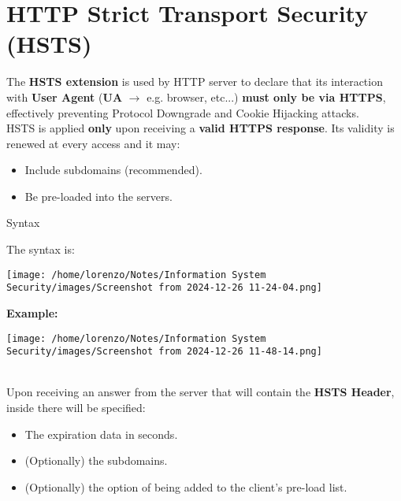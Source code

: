 \section{HTTP Strict Transport Security (HSTS)}
The \textbf{HSTS extension} is used by HTTP server to declare that its interaction with \textbf{User Agent} (\textbf{UA} \(\rightarrow\) e.g. browser, etc...) \textbf{must only be via HTTPS}, effectively preventing Protocol Downgrade and Cookie Hijacking attacks.\\ HSTS is applied \textbf{only} upon receiving a \textbf{valid HTTPS response}. Its validity is renewed at every access and it may:
\begin{itemize}
    \item Include subdomains (recommended).
    \item Be pre-loaded into the servers.
\end{itemize}
\begin{quotebox-grey}{Syntax}   
\begin{minipage}{0.4\textwidth}
    The syntax is:
    \begin{center}
        \texttt{[image: /home/lorenzo/Notes/Information System Security/images/Screenshot from 2024-12-26 11-24-04.png]}  
    \end{center}
\end{minipage} 
\hspace{1cm}
\begin{minipage}{0.4\textwidth}
    \textbf{Example:}
    \begin{center}
        \texttt{[image: /home/lorenzo/Notes/Information System Security/images/Screenshot from 2024-12-26 11-48-14.png]} 
    \end{center} 
\end{minipage}
\newline
\\
Upon receiving an answer from the server that will contain the \textbf{HSTS Header}, inside there will be specified:
\begin{itemize}
    \item The expiration data in seconds.
    \item (Optionally) the subdomains.
    \item (Optionally) the option of being added to the client's pre-load list.
\end{itemize}
\end{quotebox-grey}

